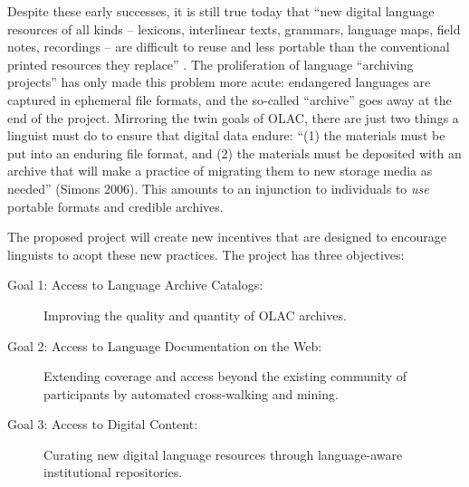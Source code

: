 
Despite these early successes, it is still true today that ``new
digital language resources of all kinds -- lexicons, interlinear
texts, grammars, language maps, field notes, recordings -- are
difficult to reuse and less portable than the conventional printed
resources they replace'' \citep{BirdSimons03language}.  The proliferation of
language ``archiving projects'' has only made this problem more
acute: endangered languages are captured in ephemeral file formats,
and the so-called ``archive'' goes away at the end of the project.
Mirroring the twin goals of OLAC, there are just two things a linguist
must do to ensure that digital data endure: ``(1) the materials must be
put into an enduring file format, and (2) the materials must be
deposited with an archive that will make a practice of migrating them
to new storage media as needed'' (Simons 2006).  This amounts to an
injunction to individuals to \emph{use} portable formats and credible
archives.

The proposed project will create new incentives that are designed to
encourage linguists to acopt these new practices.  The project has
three objectives:

\begin{description}
  \item[Goal 1: Access to Language Archive Catalogs:]
    Improving the quality and quantity of OLAC archives.

  \item[Goal 2: Access to Language Documentation on the Web:]
    Extending coverage and access beyond the existing community of
    participants by automated cross-walking and mining.

  \item[Goal 3: Access to Digital Content:]
    Curating new digital language resources through
    language-aware institutional repositories.
\end{description}

